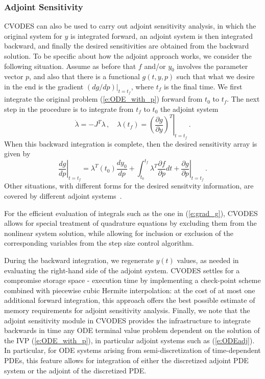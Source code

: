 \subsubsection{Adjoint Sensitivity}
CVODES can also be used to carry out adjoint sensitivity analysis, 
in which the original system for $y$ is integrated forward, 
an adjoint system is then integrated backward, and finally the desired 
sensitivities are obtained from the backward solution. 
To be specific about how the adjoint approach works, we consider
the following situation.  Assume as before that $f$ and/or $y_0$
involves the parameter vector $p$, and also that there is a
functional $g(t,y,p)$ such that what we desire in the end is the
gradient $(dg/dp)|_{t=t_f}$, where $t_f$ is the final time.  
We first integrate the original problem (\ref{e:ODE_with_p}) forward 
from $t_0$ to $t_f$. The next step in the procedure is to integrate 
from $t_f$ to $t_0$ the adjoint system
\begin{equation}\label{e:ODEadj}
  \dot{\lambda} = -J^T \lambda \, , \quad
  \lambda(t_f) = \left. \left( \frac{\partial g}{\partial y}
    \right)^T \right| _{t=t_f} \, .
\end{equation}
When this backward integration is complete, then the desired
sensitivity array is given by
\begin{equation}\label{e:grad_g}
  \left. \frac{dg}{dp}\right|_{t=t_f} = 
  \lambda^T(t_0) \frac{dy_0}{dp}
  + \int_{t_0}^{t_f} \lambda^T \frac{\partial f}{\partial p} dt + 
  \left. \frac{\partial g}{\partial p} \right|_{t=t_f} \, . 
\end{equation}
Other situations, with different forms for the desired sensitvity
information, are covered by different adjoint systems~\cite{CLPS:03}.

For the efficient evaluation of integrals such as the one in (\ref{e:grad_g}),
CVODES allows for special treatment of quadrature equations by excluding them
from the nonlinear system solution, while allowing for inclusion or exclusion
of the corresponding variables from the step size control algorithm.

During the backward integration, we regenerate $y(t)$ values, as needed
in evaluating the right-hand side of the adjoint system.
%
CVODES settles for a compromise storage space - execution time by implementing
a check-point scheme combined with piecewise cubic Hermite interpolation: 
at the cost of at most one additional forward integration, this approach 
offers the best possible estimate of memory requirements for adjoint 
sensitivity analysis.
%
Finally, we note that the adjoint sensitivity module in CVODES provides 
the infrastructure to integrate backwards in time any ODE terminal value 
problem dependent on the solution of the IVP (\ref{e:ODE_with_p}), 
in particular adjoint systems such as (\ref{e:ODEadj}). In particular, 
for ODE systems arising from semi-discretization of time-dependent PDEs, 
this feature allows for integration of either the discretized adjoint 
PDE system or the adjoint of the discretized PDE.

